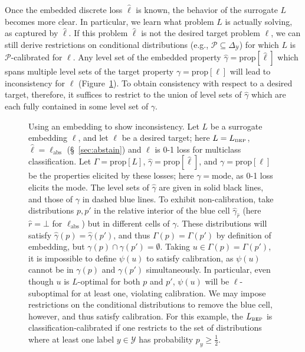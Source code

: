 \documentclass[twoside,11pt]{article}
\newcommand{\prop}[1]{\mathrm{prop}[#1]}
\newcommand{\BEP}{L_{\text{\tiny BEP}}}
\newcommand{\ellabstain}{\ell_{\text{abs}}}
\newcommand{\mode}{\mathrm{mode}}
\newcommand{\simplex}{\Delta_\Y}
\renewcommand{\P}{\mathcal{P}}
\newcommand{\Y}{\mathcal{Y}}
\begin{document}
Once the embedded discrete loss $\hat\ell$ is known, the behavior of the surrogate $L$ becomes more clear.
In particular, we learn what problem $L$ is actually solving, as captured by $\hat\ell$.
If this problem $\hat\ell$ is not the desired target problem $\ell$, we can still derive restrictions on conditional distributions (e.g., $\P \subseteq \simplex$) for which $L$ is $\P$-calibrated for $\ell$.
Any level set of the embedded property $\hat\gamma = \prop{\hat\ell}$ which spans multiple level sets of the target property $\gamma=\prop{\ell}$ will lead to inconsistency for $\ell$ (Figure~\ref{fig:abstain-intuition-inconsistent}).
To obtain consistency with respect to a desired target, therefore, it suffices to restrict to the union of level sets of $\hat\gamma$ which are each fully contained in some level set of $\gamma$.

\begin{figure}
	\begin{minipage}{0.28\linewidth}
    
\end{minipage}
\begin{minipage}{0.72\linewidth}
	\caption{Using an embedding to show inconsistency.
    Let $L$ be a surrogate embedding $\ell$, and let $\ell$ be a desired target; here $L=\BEP$, $\hat\ell = \ellabstain$ (\S~\ref{sec:abstain}) and $\ell$ is 0-1 loss for multiclass classification.
    Let $\Gamma = \prop{L}$, $\hat\gamma = \prop{\hat\ell}$, and $\gamma = \prop{\ell}$ be the properties elicited by these losses; here $\gamma = \mode$, as 0-1 loss elicits the mode.
    The level sets of $\hat\gamma$ are given in solid black lines, and those of $\gamma$ in dashed blue lines.
    To exhibit non-calibration, take distributions $p, p'$ in the relative interior of the blue cell $\hat \gamma_{\hat r}$ (here $\hat r=\bot$ for $\ellabstain$) but in different cells of $\gamma$.
    These distributions will satisfy $\hat\gamma(p) = \hat\gamma(p')$, and thus $\Gamma(p) = \Gamma(p')$ by definition of embedding, but $\gamma(p) \cap \gamma(p') = \emptyset$.
    Taking $u\in\Gamma(p)=\Gamma(p')$, it is impossible to define $\psi(u)$ to satisfy calibration, as $\psi(u)$ cannot be in $\gamma(p)$ and $\gamma(p')$ simultaneously.
    In particular, even though $u$ is $L$-optimal for both $p$ and $p'$, $\psi(u)$ will be $\ell$-suboptimal for at least one, violating calibration.
    We may impose restrictions on the conditional distributions to remove the blue cell, however, and thus satisfy calibration.
    For this example, the $\BEP$ is classification-calibrated if one restricts to the set of distributions where at least one label $y\in\Y$ has probability $p_y \geq \tfrac 1 2$.
	}
	\label{fig:abstain-intuition-inconsistent}
	\end{minipage}
\end{figure}
\end{document}
